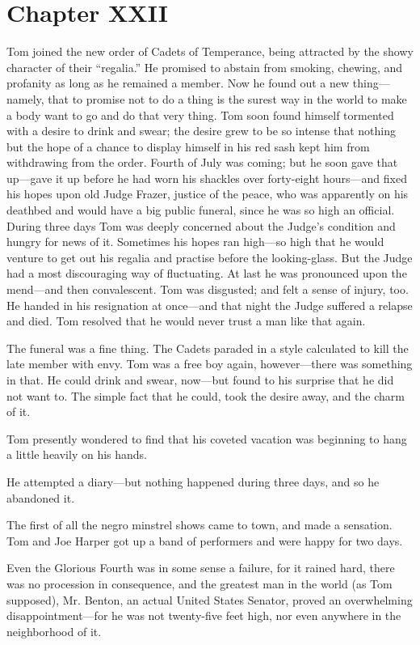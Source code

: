 \documentclass{book}
\begin{document}
\chapter*{Chapter XXII}

Tom joined the new order of Cadets of Temperance, being attracted by the showy character of their “regalia.” He promised to abstain from smoking, chewing, and profanity as long as he remained a member. Now he found out a new thing—namely, that to promise not to do a thing is the surest way in the world to make a body want to go and do that very thing. Tom soon found himself tormented with a desire to drink and swear; the desire grew to be so intense that nothing but the hope of a chance to display himself in his red sash kept him from withdrawing from the order. Fourth of July was coming; but he soon gave that up—gave it up before he had worn his shackles over forty-eight hours—and fixed his hopes upon old Judge Frazer, justice of the peace, who was apparently on his deathbed and would have a big public funeral, since he was so high an official. During three days Tom was deeply concerned about the Judge’s condition and hungry for news of it. Sometimes his hopes ran high—so high that he would venture to get out his regalia and practise before the looking-glass. But the Judge had a most discouraging way of fluctuating. At last he was pronounced upon the mend—and then convalescent. Tom was disgusted; and felt a sense of injury, too. He handed in his resignation at once—and that night the Judge suffered a relapse and died. Tom resolved that he would never trust a man like that again.

The funeral was a fine thing. The Cadets paraded in a style calculated to kill the late member with envy. Tom was a free boy again, however—there was something in that. He could drink and swear, now—but found to his surprise that he did not want to. The simple fact that he could, took the desire away, and the charm of it.

Tom presently wondered to find that his coveted vacation was beginning to hang a little heavily on his hands.

He attempted a diary—but nothing happened during three days, and so he abandoned it.

The first of all the negro minstrel shows came to town, and made a sensation. Tom and Joe Harper got up a band of performers and were happy for two days.

Even the Glorious Fourth was in some sense a failure, for it rained hard, there was no procession in consequence, and the greatest man in the world (as Tom supposed), Mr. Benton, an actual United States Senator, proved an overwhelming disappointment—for he was not twenty-five feet high, nor even anywhere in the neighborhood of it.
\end{document}
